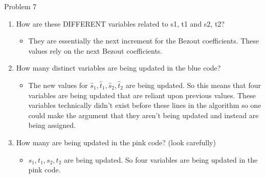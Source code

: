 \begin{problem}{Problem 7}
\begin{Highlight}[Solution]
        \begin{enumerate}[start = 7]
            \item How are these DIFFERENT variables related to s1, t1 and s2, t2?
            \begin{itemize}
                \item They are essentially the next increment for the Bezout coefficients. These values rely on the next Bezout coefficients.
            \end{itemize}
            \item How many distinct variables are being updated in the blue code?
            \begin{itemize}
                \item The new values for $\hat{s}_{1},\hat{t}_{1},\hat{s}_{2},\hat{t}_{2}$ are being updated. So this means that four variables are being updated that are reliant upon previous values.
                These variables technically didn't exist before these lines in the algorithm so one could make the argument that they aren't being updated and instead are being assigned.
            \end{itemize}
            \item How many are being updated in the pink code? (look carefully)
            \begin{itemize}
                \item $s_{1},t_{1},s_{2},t_{2}$ are being updated. So four variables are being updated in the pink code.
            \end{itemize}
        \end{enumerate}
    \end{Highlight}
\end{problem}

